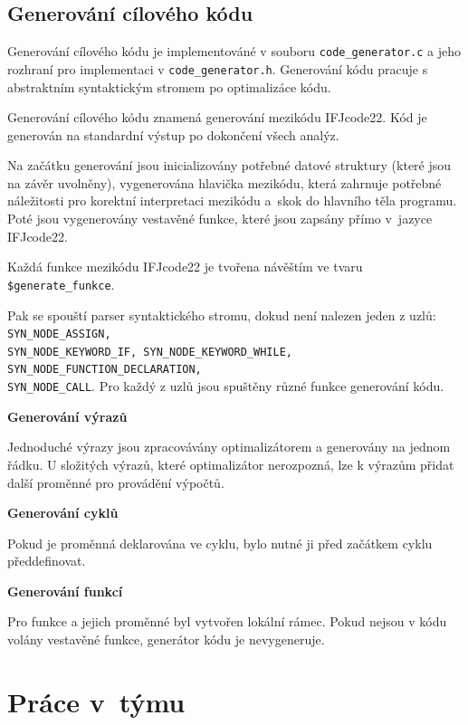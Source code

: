 \documentclass[a4paper, 11pt]{article}
\begin{document}
	\subsection{Generování cílového kódu}
    Generování cílového kódu je implementováné v souboru \texttt{code\_generator.c} a jeho rozhraní pro implementaci
	v \texttt{code\_generator.h}.  Generování kódu pracuje s abstraktním syntaktickým stromem po optimalizáce kódu.

    Generování cílového kódu znamená generování mezikódu IFJcode22. Kód je generován na standardní výstup po dokončení všech analýz.

	Na začátku generování jsou inicializovány potřebné datové struktury (které jsou na závěr uvolněny), vygenerována hlavička mezikódu, která zahrnuje potřebné náležitosti pro korektní interpretaci mezikódu a~skok do hlavního těla programu. Poté jsou vygenerovány vestavěné funkce, které jsou zapsány přímo v~jazyce IFJcode22.

     Každá funkce mezikódu IFJcode22 je tvořena návěštím ve tvaru \texttt{\$generate\_funkce}.

    Pak se spouští parser syntaktického stromu, dokud není nalezen jeden z uzlů: \texttt{SYN\_NODE\_ASSIGN, \\SYN\_NODE\_KEYWORD\_IF, SYN\_NODE\_KEYWORD\_WHILE, SYN\_NODE\_FUNCTION\_DECLARATION, \\SYN\_NODE\_CALL}. Pro každý z uzlů jsou spuštěny různé funkce generování kódu.

    \textbf{Generování výrazů}

    Jednoduché výrazy jsou zpracovávány optimalizátorem a generovány na jednom řádku.
    U složitých výrazů, které optimalizátor nerozpozná, lze k výrazům přidat další proměnné pro provádění výpočtů.

    \textbf{Generování cyklů}

    Pokud je proměnná deklarována ve cyklu, bylo nutné ji před začátkem cyklu předdefinovat.

    \textbf{Generování funkcí}

    Pro funkce a jejich proměnné byl vytvořen lokální rámec.
     Pokud nejsou v kódu volány vestavěné funkce, generátor kódu je nevygeneruje.





	\section{Práce v~týmu}
\end{document}
